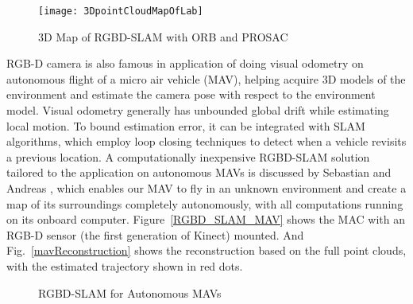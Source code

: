 \begin{figure}[t]
\centering
\texttt{[image: 3DpointCloudMapOfLab]}
\caption{3D Map of RGBD-SLAM with ORB and PROSAC \cite{indorRGBDSLAM_2015}}
\label{3DpointCloudMapOfLab}
\end{figure}%
%
RGB-D camera is also famous in application of doing visual odometry on autonomous flight of a micro air vehicle (MAV), helping acquire 3D models of the environment and estimate the camera pose with respect to the environment model. Visual odometry generally has unbounded global drift while estimating local motion. To bound estimation error, it can be integrated with SLAM algorithms, which employ loop closing techniques to detect when a vehicle revisits a previous location. A computationally inexpensive RGBD-SLAM solution tailored to the application on autonomous MAVs is discussed by Sebastian and Andreas \cite{RGBDSLAMmav_2013}, which enables our MAV to fly in an unknown environment and create a map of its surroundings completely autonomously, with all computations running on its onboard computer. Figure~\ref{RGBD_SLAM_MAV} shows the MAC with an RGB-D sensor (the first generation of Kinect) mounted. And Fig.~\ref{mavReconstruction} shows the reconstruction based on the full point clouds, with the estimated trajectory shown in red dots. 
%
\\\indent
%
\begin{figure}[t]
\centering
{}
\caption{RGBD-SLAM for Autonomous MAVs \cite{RGBDSLAMmav_2013}}
\label{autoRGBD_SLAM_MAV}
\end{figure}%
